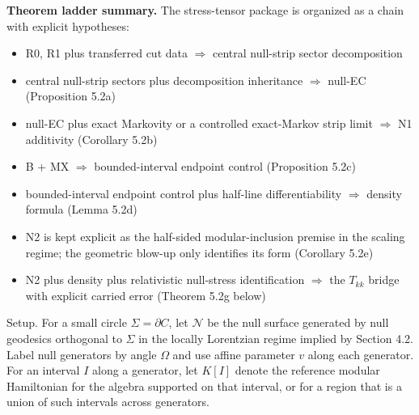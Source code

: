 \textbf{Theorem ladder summary.} The stress-tensor package is organized as a chain with explicit hypotheses:
\begin{itemize}
\tightlist
\item
  R0, R1 plus transferred cut data \(\Longrightarrow\) central null-strip sector decomposition
\item
  central null-strip sectors plus decomposition inheritance \(\Longrightarrow\) null-EC (Proposition 5.2a)
\item
  null-EC plus exact Markovity or a controlled exact-Markov strip limit \(\Longrightarrow\) N1 additivity (Corollary 5.2b)
\item
  B + MX \(\Longrightarrow\) bounded-interval endpoint control (Proposition 5.2c)
\item
  bounded-interval endpoint control plus half-line differentiability \(\Longrightarrow\) density formula (Lemma 5.2d)
\item
  N2 is kept explicit as the half-sided modular-inclusion premise in the scaling regime; the geometric blow-up only identifies its form (Corollary 5.2e)
\item
  N2 plus density plus relativistic null-stress identification \(\Longrightarrow\) the \(T_{kk}\) bridge with explicit carried error (Theorem 5.2g below)
\end{itemize}

Setup. For a small circle \(\Sigma = \partial C\), let \(\mathcal N\) be the null surface generated by null geodesics orthogonal to \(\Sigma\) in the locally Lorentzian regime implied by Section 4.2. Label null generators by angle \(\Omega\) and use affine parameter \(v\) along each generator. For an interval \(I\) along a generator, let \(K[I]\) denote the reference modular Hamiltonian for the algebra supported on that interval, or for a region that is a union of such intervals across generators.

